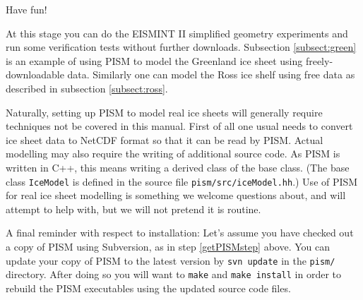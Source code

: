 \documentclass[11pt,final]{amsart}
\begin{document}
Have fun!

At this stage you can do the EISMINT II simplified geometry experiments and run some verification tests without further downloads.  Subsection \ref{subsect:green} is an example of using PISM to model the Greenland ice sheet using freely-downloadable data.  Similarly one can model the Ross ice shelf using free data as described in subsection \ref{subsect:ross}.

Naturally, setting up PISM to model real ice sheets will generally require techniques not be covered in this manual.  First of all one usual needs to convert ice sheet data to NetCDF format so that it can be read by PISM.  Actual modelling may also require the writing of additional source code.  As PISM is written in C++, this means writing a derived class of the base class.  (The base class \verb|IceModel| is defined in the source file \verb|pism/src/iceModel.hh|.)  Use of PISM for real ice sheet modelling is something we welcome questions about, and will attempt to help with, but we will not pretend it is routine.

A final reminder with respect to installation:  Let's assume you have checked out a copy of PISM using Subversion, as in step \ref{getPISMstep} above.   You can update your copy of PISM to the latest version by \verb|svn update| in the \verb|pism/| directory.  After doing so you will want to \verb|make| and \verb|make install| in order to rebuild the PISM executables using the updated source code files.
\end{document}
